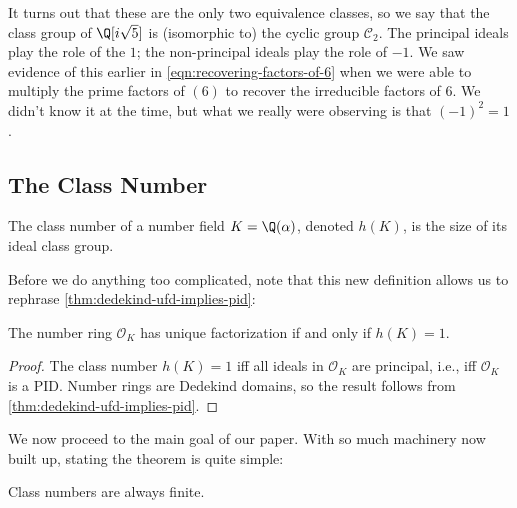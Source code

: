 It turns out that these are the only two equivalence classes, so we say that the class group of $\Q[i \sqrt 5]$ is (isomorphic to) the cyclic group $\mathcal C_2$.
The principal ideals play the role of the $1$; the non-principal ideals play the role of $-1$.
We saw evidence of this earlier in \autoref{eqn:recovering-factors-of-6} when we were able to multiply the prime factors of $(6)$ to recover the irreducible factors of $6$.
We didn't know it at the time, but what we really were observing is that $(-1)^2 = 1$.

\subsection{The Class Number}

\begin{definition}
    The class number of a number field $K = \Q(\alpha)$, denoted $h(K)$, is the size of its ideal class group.
\end{definition}

Before we do anything too complicated, note that this new definition allows us to rephrase \autoref{thm:dedekind-ufd-implies-pid}:

\begin{theorem}
    The number ring $\mathcal O_K$ has unique factorization if and only if $h(K) = 1$.
\end{theorem}

\begin{proof}
    The class number $h(K) = 1$ iff all ideals in $\mathcal O_K$ are principal, i.e., iff $\mathcal O_K$ is a PID. Number rings are Dedekind domains, so the result follows from \autoref{thm:dedekind-ufd-implies-pid}.
\end{proof}

We now proceed to the main goal of our paper. With so much machinery now built up, stating the theorem is quite simple:

\begin{theorem}
    \label{thm:clas-number-finite}
    Class numbers are always finite.
\end{theorem}

